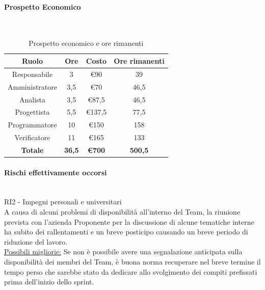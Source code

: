 \documentclass{article}
\begin{document}
                \paragraph{Prospetto Economico}\mbox{}\\
                \begin{table}[H]
                    \centering
                    \begin{tabular}{|c|c|c|c|}
                    \hline
                    \textbf{Ruolo}  & \textbf{Ore}  & \textbf{Costo} & \textbf{Ore rimanenti} \\ \hline
                    Responsabile    & 3             & €90            & 39                     \\ \hline
                    Amministratore  & 3,5           & €70            & 46,5                   \\ \hline
                    Analista        & 3,5           & €87,5          & 46,5                   \\ \hline
                    Progettista     & 5,5           & €137,5         & 77,5                   \\ \hline
                    Programmatore   & 10            & €150           & 158                    \\ \hline
                    Verificatore    & 11            & €165           & 133                    \\ \hline
                    \textbf{Totale} & \textbf{36,5} & \textbf{\euro700}   & \textbf{500,5}         \\ \hline
                    \end{tabular}
                    \caption{Prospetto economico e ore rimanenti}
                \end{table}


                \paragraph{Rischi effettivamente occorsi}\mbox{}\\
                RI2 - Impegni personali e universitari \\
                A causa di alcuni problemi di disponibilità all’interno del Team, la riunione prevista con l’azienda Proponente per la discussione di alcune tematiche interne ha subito dei rallentamenti e un breve posticipo causando un breve periodo di riduzione del lavoro. \\
                \underline{Possibili migliorie:} Se non è possibile avere una segnalazione anticipata sulla disponibilità dei membri del Team, è buona norma recuperare nel breve termine il tempo perso che sarebbe stato da dedicare allo svolgimento dei compiti prefissati prima dell’inizio dello sprint.
\end{document}
